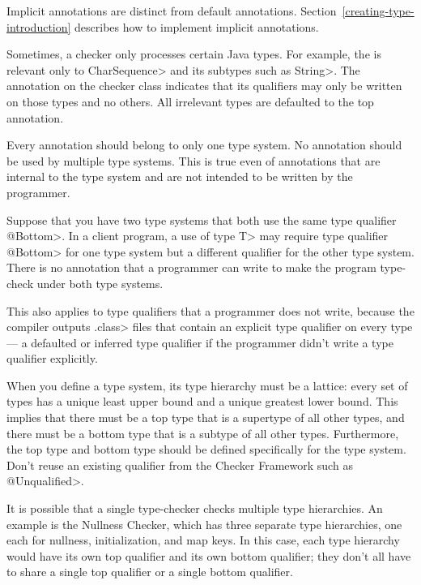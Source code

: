 Implicit annotations are distinct from default annotations.
Section~\ref{creating-type-introduction} describes how to implement
implicit annotations.



Sometimes, a checker only processes certain Java types.  For example, the
 is relevant only to
\<CharSequence> and its subtypes such as \<String>.
The 
annotation on the checker class indicates that its qualifiers may only be
written on those types and no others.  All irrelevant types are defaulted to
the top annotation.



Every annotation should belong to only one type system.  No annotation
should be used by multiple type systems.  This is true even of annotations
that are internal to the type system and are not intended to be written by
the programmer.

Suppose that you have two type systems that both use the same type
qualifier \<@Bottom>.  In a client program, a use of type \<T> may require type
qualifier \<@Bottom> for one type system but a different qualifier for the other
type system.  There is no annotation that a programmer can write to make
the program type-check under both type systems.

This also applies to type qualifiers that a programmer does not write,
because the compiler outputs \<.class> files that contain an explicit type
qualifier on every type --- a defaulted or inferred type qualifier if the
programmer didn't write a type qualifier explicitly.



When you define a type system, its type hierarchy must be a
lattice:  every set of types has a unique least upper bound and a unique
greatest lower bound.  This implies that there must be a top type that is a
supertype of all other types, and there must be a bottom type that is a
subtype of all other types.
Furthermore, the top type and bottom type should be defined
specifically for the type system.  Don't reuse an existing qualifier from the
Checker Framework such as \<@Unqualified>.

It is possible that a single type-checker checks multiple type hierarchies.
An example is the Nullness Checker, which has three separate type
hierarchies, one each for
nullness, initialization, and map keys.  In this case, each type hierarchy
would have its own top qualifier and its own bottom qualifier; they don't
all have to share a single top qualifier or a single bottom qualifier.



